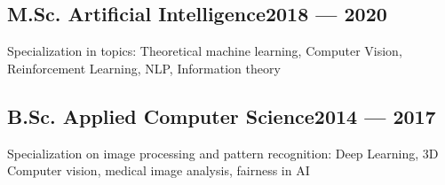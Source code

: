 \subsection{{M.Sc. Artificial Intelligence\hfill 2018 --- 2020}}
\begin{zitemize}
\item Specialization in topics: Theoretical machine learning, Computer Vision, Reinforcement Learning, NLP, Information theory
\end{zitemize}

\subsection{{B.Sc. Applied Computer Science\hfill 2014 --- 2017}}
\begin{zitemize}
\item Specialization on image processing and pattern recognition: Deep Learning, 3D Computer vision, medical image analysis, fairness in AI
\end{zitemize}



